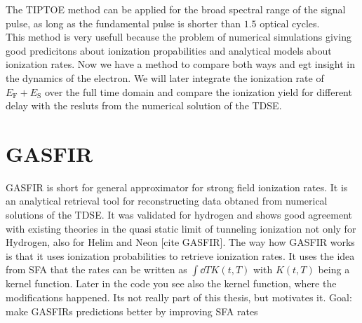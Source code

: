 The TIPTOE method can be applied for the broad spectral range of the signal pulse, as long as the fundamental pulse is shorter than $1.5$ optical cycles.\\
This method is very usefull because the problem of numerical simulations giving good predicitons about ionization propabilities and analytical models about ionization rates.
Now we have a method to compare both ways and egt insight in the dynamics of the electron. 
We will later integrate the ionization rate of $E_{\mathrm{F}}+E_{\mathrm{S}}$ over the full time domain and compare the ionization yield for different delay with the resluts from the numerical solution of the TDSE.







\section{GASFIR}
GASFIR is short for general approximator for strong field ionization rates.
It is an analytical retrieval tool for reconstructing data obtaned from numerical solutions of the TDSE. 
It was validated for hydrogen and shows good agreement with existing theories in the quasi static limit of tunneling ionization not only for Hydrogen, also for Helim and Neon [cite GASFIR].
The way how GASFIR works is that it uses ionization probabilities to retrieve ionization rates. 
It uses the idea from SFA that the rates can be written as $\int \dd T K(t,T)$ with $K(t,T)$ being a kernel function.
Later in the code you see also the kernel function, where the modifications happened. 
Its not really part of this thesis, but motivates it.
Goal: make GASFIRs predictions better by improving SFA rates




